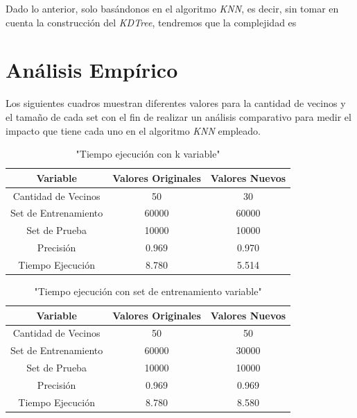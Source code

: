 \documentclass[12pt]{article}
\begin{document}
\hspace{5mm}
Dado lo anterior, solo basándonos en el algoritmo \textit{KNN}, es decir, sin tomar en cuenta la construcción 
del \textit{KDTree}, tendremos que la complejidad es 

\section*{Análisis Empírico}
\hspace{5mm}
Los siguientes cuadros muestran diferentes valores para la cantidad de vecinos y el tamaño de 
cada set con el fin de realizar un análisis comparativo para medir el impacto que tiene cada uno 
en el algoritmo \textit{KNN} empleado.
\begin{center}
    \begin{table}[h]
        \caption{"Tiempo ejecución con k variable"}
        \centering
        \begin{tabular} {| c | c | c |}
            \hline
            Variable & Valores Originales & Valores Nuevos \\
            \hline \hline
            Cantidad de Vecinos & 50 & 30  \\
            Set de Entrenamiento & 60000 & 60000\\
            Set de Prueba & 10000 & 10000 \\
            \hline
            Precisión & 0.969 & 0.970 \\
            Tiempo Ejecución & 8.780 & 5.514 \\
            \hline
        \end{tabular}
    \end{table}
    \begin{table}[h]
        \caption{"Tiempo ejecución con set de entrenamiento variable"}
        \centering
        \begin{tabular} {| c | c | c |}
            \hline
            Variable & Valores Originales & Valores Nuevos \\
            \hline \hline
            Cantidad de Vecinos & 50 & 50  \\
            Set de Entrenamiento & 60000 & 30000 \\
            Set de Prueba & 10000 & 10000 \\
            \hline
            Precisión & 0.969 & 0.969 \\
            Tiempo Ejecución & 8.780 & 8.580 \\
            \hline
        \end{tabular}
    \end{table}
\end{center}
\end{document}
